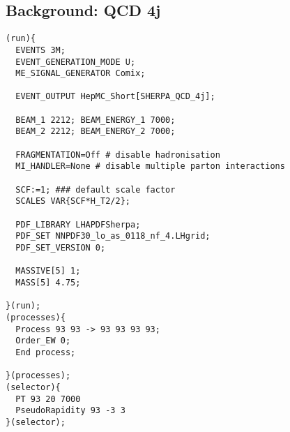 \documentclass[12pt]{article}
\begin{document}
\subsection {Background: QCD 4j}
\begin{verbatim}
(run){
  EVENTS 3M;
  EVENT_GENERATION_MODE U;
  ME_SIGNAL_GENERATOR Comix;

  EVENT_OUTPUT HepMC_Short[SHERPA_QCD_4j];

  BEAM_1 2212; BEAM_ENERGY_1 7000;
  BEAM_2 2212; BEAM_ENERGY_2 7000;

  FRAGMENTATION=Off # disable hadronisation
  MI_HANDLER=None # disable multiple parton interactions

  SCF:=1; ### default scale factor
  SCALES VAR{SCF*H_T2/2};

  PDF_LIBRARY LHAPDFSherpa;
  PDF_SET NNPDF30_lo_as_0118_nf_4.LHgrid;
  PDF_SET_VERSION 0;

  MASSIVE[5] 1;
  MASS[5] 4.75;

}(run);
(processes){
  Process 93 93 -> 93 93 93 93;
  Order_EW 0;
  End process;

}(processes);
(selector){
  PT 93 20 7000
  PseudoRapidity 93 -3 3
}(selector);
\end{verbatim}

\end{document}
